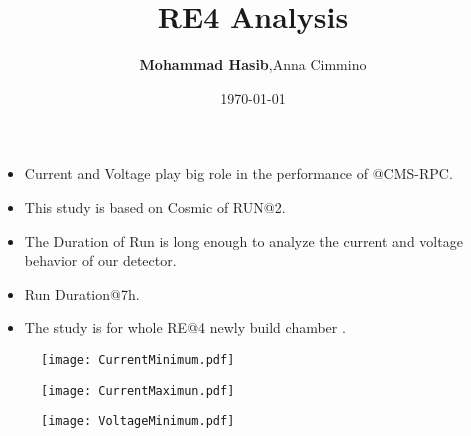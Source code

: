 \documentclass[slidestop,compress,mathserif]{beamer}
\title[RPC presentation]{RE4 Analysis}
\author[Mohammad Hasib]{{\bf Mohammad Hasib},Anna Cimmino}
\institute[University of Delhi]{University of Delhi}
\date{\today}
\begin{document}
\renewcommand{\inserttotalframenumber}{\pageref{lastslide}}
\begin{frame}
\titlepage
\end{frame}

\begin{frame}\frametitle{}	\begin{itemize}	\item Current and Voltage play big role in the performance of @CMS-RPC. \hspace*{3.00cm}~ \item  This study is based on Cosmic of RUN@2. \hspace*{3.00cm}~ \item The Duration of Run is long enough to analyze the current and voltage behavior of our detector. \hspace*{3.00cm}~ \item Run Duration@7h. \hspace*{3.00cm}~ \item The study is for whole RE@4 newly build chamber .\end{itemize}	\end{frame}



\begin{frame}
\begin{figure}
\centering
\texttt{[image: CurrentMinimum.pdf]}
\end{figure}
\end{frame}

\begin{frame}
\begin{figure}
\centering
\texttt{[image: CurrentMaximun.pdf]}
\end{figure}
\end{frame}

\begin{frame}
\begin{figure}
\centering
\texttt{[image: VoltageMinimum.pdf]}
\end{figure}
\end{frame}
\end{document}
